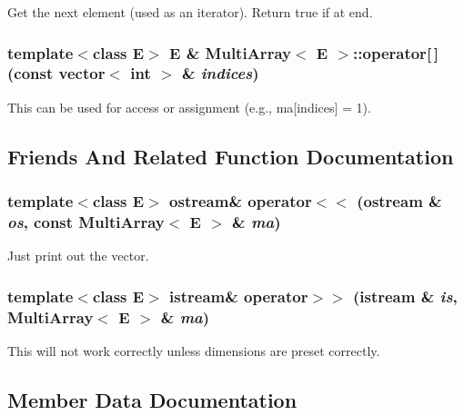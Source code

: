 Get the next element (used as an iterator). Return true if at end.

\subsubsection{\setlength{\rightskip}{0pt plus 5cm}template$<$class E$>$ E \& Multi\-Array$<$ E $>$::operator[$\,$] (const vector$<$ int $>$ \& {\em indices})\hspace{0.3cm}{\tt  [inline]}}\label{classMultiArray_a4}


This can be used for access or assignment (e.g., ma[indices] = 1).



\subsection{Friends And Related Function Documentation}
\subsubsection{\setlength{\rightskip}{0pt plus 5cm}template$<$class E$>$ ostream\& operator$<$$<$ (ostream \& {\em os}, const Multi\-Array$<$ E $>$ \& {\em ma})\hspace{0.3cm}{\tt  [friend]}}\label{classMultiArray_l1}


Just print out the vector.

\subsubsection{\setlength{\rightskip}{0pt plus 5cm}template$<$class E$>$ istream\& operator$>$$>$ (istream \& {\em is}, Multi\-Array$<$ E $>$ \& {\em ma})\hspace{0.3cm}{\tt  [friend]}}\label{classMultiArray_l0}


This will not work correctly unless dimensions are preset correctly.



\subsection{Member Data Documentation}
